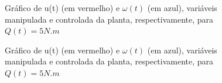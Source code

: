 \documentclass[11pt]{article}
\begin{document}
\begin{figure}[!htb]
        \caption{\label{fig:my-label} Gráfico de u(t) (em vermelho) e $\omega(t)$ (em azul), variáveis manipulada e controlada da planta, respectivamente, para $Q(t) = 5 N.m$}
      \end{figure}
    
\begin{figure}[!htb]
        \caption{\label{fig:my-label} Gráfico de u(t) (em vermelho) e $\omega(t)$ (em azul), variáveis manipulada e controlada da planta, respectivamente, para $Q(t) = 5 N.m$}
      \end{figure}
\end{document}
